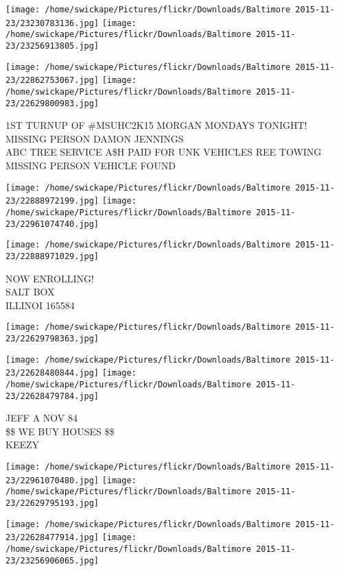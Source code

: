 \documentclass[10pt,letterpaper]{article}
\begin{document}
\texttt{[image: /home/swickape/Pictures/flickr/Downloads/Baltimore 2015-11-23/23230783136.jpg]}
\texttt{[image: /home/swickape/Pictures/flickr/Downloads/Baltimore 2015-11-23/23256913805.jpg]}

\texttt{[image: /home/swickape/Pictures/flickr/Downloads/Baltimore 2015-11-23/22862753067.jpg]}
\texttt{[image: /home/swickape/Pictures/flickr/Downloads/Baltimore 2015-11-23/22629800983.jpg]}

1ST TURNUP OF \#MSUHC2K15 MORGAN MONDAYS TONIGHT!\\
MISSING PERSON DAMON JENNINGS\\
ABC TREE SERVICE A\$H PAID FOR UNK VEHICLES REE TOWING\\
MISSING PERSON VEHICLE FOUND
\pagebreak

\texttt{[image: /home/swickape/Pictures/flickr/Downloads/Baltimore 2015-11-23/22888972199.jpg]}
\texttt{[image: /home/swickape/Pictures/flickr/Downloads/Baltimore 2015-11-23/22961074740.jpg]}

\texttt{[image: /home/swickape/Pictures/flickr/Downloads/Baltimore 2015-11-23/22888971029.jpg]}

NOW ENROLLING!\\
SALT BOX\\
ILLINOI 165584
\pagebreak

\texttt{[image: /home/swickape/Pictures/flickr/Downloads/Baltimore 2015-11-23/22629798363.jpg]}

\vspace{0.25in}
\texttt{[image: /home/swickape/Pictures/flickr/Downloads/Baltimore 2015-11-23/22628480844.jpg]}
\texttt{[image: /home/swickape/Pictures/flickr/Downloads/Baltimore 2015-11-23/22628479784.jpg]}

JEFF A NOV 84\\
\$\$ WE BUY HOUSES \$\$\\
KEEZY
\pagebreak

\texttt{[image: /home/swickape/Pictures/flickr/Downloads/Baltimore 2015-11-23/22961070480.jpg]}
\texttt{[image: /home/swickape/Pictures/flickr/Downloads/Baltimore 2015-11-23/22629795193.jpg]}

\texttt{[image: /home/swickape/Pictures/flickr/Downloads/Baltimore 2015-11-23/22628477914.jpg]}
\texttt{[image: /home/swickape/Pictures/flickr/Downloads/Baltimore 2015-11-23/23256906065.jpg]}
\end{document}
